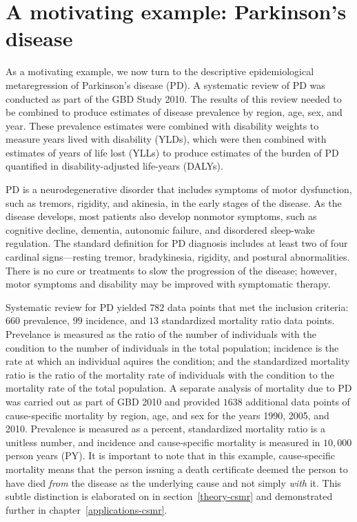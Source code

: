 \section{A motivating example: Parkinson's disease}
\label{intro-complete_ex}

As a motivating example, we now turn to the descriptive
epidemiological metaregression of Parkinson's disease (PD). A
systematic review of PD was conducted as part of the GBD
Study 2010.\cite{vos_years_2012} The results of this
review needed to be combined to produce estimates of disease prevalence by
region, age, sex, and year.  These prevalence estimates were combined
with disability weights to measure years lived with disability (YLDs),
which were then combined with estimates of years of life lost (YLLs)
to produce estimates of the burden of PD quantified in disability-adjusted life-years (DALYs).

PD is a neurodegenerative disorder that includes symptoms of motor
dysfunction, such as tremors, rigidity, and akinesia, in the early
stages of the disease.  As the disease develops, most patients also
develop nonmotor symptoms, such as cognitive decline, dementia,
autonomic failure, and disordered sleep-wake regulation.  The standard
definition for PD diagnosis includes at least two of four cardinal
signs---resting tremor, bradykinesia, rigidity, and postural abnormalities.
There is no cure or treatments to slow the progression of the disease;
however, motor symptoms and disability may be improved with
symptomatic therapy.\cite{poewe_natural_2006, pollock_prevalence_1966, larsen_clinical_1994}

Systematic review for PD yielded $782$ data points that met the inclusion criteria: $660$
prevalence, $99$ incidence, and $13$ standardized mortality ratio data
points.  Prevelance is measured as the ratio of the number of individuals with the condition to
the number of individuals in the total population; incidence is the rate at which
an individual aquires the condition; and the standardized mortality ratio is the
ratio of the mortality rate of individuals with the condition to the
mortality rate of the total population.  A separate analysis of
mortality due to PD was carried out as part of GBD 2010 and
provided $1638$ additional data points of cause-specific mortality by
region, age, and sex for the years 1990, 2005, and 2010.  Prevalence
is measured as a percent, standardized mortality ratio is a unitless number, and
incidence and cause-specific mortality is measured in $10,000$ person
years (PY).  It is important to note that in this example, cause-specific mortality means
that the person issuing a death certificate deemed the person to
have died \emph{from} the disease as the underlying cause and not
simply \emph{with} it.  This subtle distinction is elaborated on in
section~\ref{theory-csmr} and demonstrated further in
chapter~\ref{applications-csmr}.

